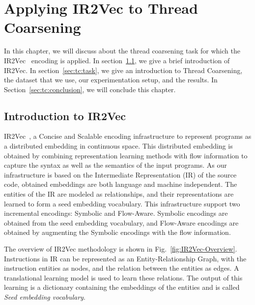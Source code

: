 \chapter{Applying IR2Vec to Thread Coarsening}
\label{chap:ch2}

In this chapter, we will discuss about the thread coarsening task for which the IR2Vec~\cite{IR2Vec} encoding is applied. In section~\ref{sec:tc:introir2vec}, we give a brief introduction of IR2Vec. In section~\ref{sec:tc:task}, we give an introduction to Thread Coarsening, the dataset that we use, our experimentation setup, and the results. 
In Section~\ref{sec:tc:conclusion}, we will conclude this chapter.


\section{Introduction to IR2Vec}\label{sec:tc:introir2vec}
IR2Vec~\cite{IR2Vec}, a Concise and Scalable encoding infrastructure to represent programs as a distributed embedding in continuous space. This distributed embedding is obtained by combining representation learning methods with flow information to capture the syntax as well as the semantics of the input programs. As our infrastructure is based on the Intermediate Representation (IR) of the source code, obtained embeddings are both language and machine independent. The entities of the IR are modeled as relationships, and their
representations are learned to form a seed embedding vocabulary. This infrastructure support two incremental encodings: Symbolic and Flow-Aware. Symbolic encodings are obtained from the seed embedding vocabulary, and Flow-Aware encodings are obtained by augmenting the Symbolic encodings with the flow information.

The overview of IR2Vec methodology is shown in Fig.~\ref{fig:IR2Vec-Overview}. Instructions in IR can be represented as an Entity-Relationship Graph, with the instruction entities as nodes, and the relation between the entities as edges. A translational learning model is used to learn these relations. The output of this learning is a dictionary containing the embeddings of the entities and is called \textit{Seed embedding vocabulary}. 

